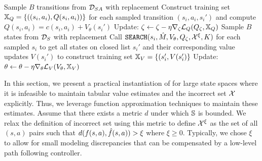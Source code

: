 \begin{algorithm}[t]
\begin{algorithmic}[1]
	\label{line:q-update}
		\State Sample $B$ transitions from $\mathcal{D}_{SA}$ with replacement\label{line:transition-sample}
		\State Construct training set $\mathbb{X}_Q = \{((s_i, a_i), Q(s_i, a_i))\}$ for each sampled transition $(s_i, a_i, s_i')$ and compute $Q(s_i, a_i) = c(s_i, a_i) + V_\theta(s_i')$
		\State Update: $\zeta \leftarrow \zeta - \eta \nabla_\zeta \mathcal{L}_Q(Q_\zeta, \mathbb{X}_Q)$
	\EndProcedure
	\label{line:v-update}
		\State Sample $B$ states from $\mathcal{D}_S$ with replacement\label{line:state-sample}
		\State Call $\mathtt{SEARCH}(s_i, \hat{M}, V_\theta, Q_\zeta, \mathcal{X}^\xi, K)$ for each sampled $s_i$ to get all states on closed list $s_i'$ and their corresponding value updates $V(s_i')$ to construct training set $\mathbb{X}_V = \{(s_i', V(s_i')\}$
		\State Update: $\theta \leftarrow \theta - \eta \nabla_\theta \mathcal{L}_V(V_\theta, \mathbb{X}_V)$
	\EndProcedure
	\end{algorithmic}
	\label{alg:large-state-spaces}
\end{algorithm}


In this section, we present a practical instantiation of \cmaxpp{} for
large state spaces where it is infeasible to maintain tabular value
estimates and the incorrect set $\mathcal{X}$ explicitly. Thus, we
leverage function approximation techniques to maintain these
estimates. Assume that there exists a 
metric $d$ under which $\mathbb{S}$ is bounded. We relax the definition
of incorrect set using this metric to define $\mathcal{X}^\xi$ as
the set of all $(s, a)$ pairs such that $d(f(s, a), \hat{f}(s, a)) >
\xi$ where $\xi \geq 0$. Typically, we chose $\xi$ to allow for small
modeling discrepancies that can be compensated by a low-level path
following controller.

